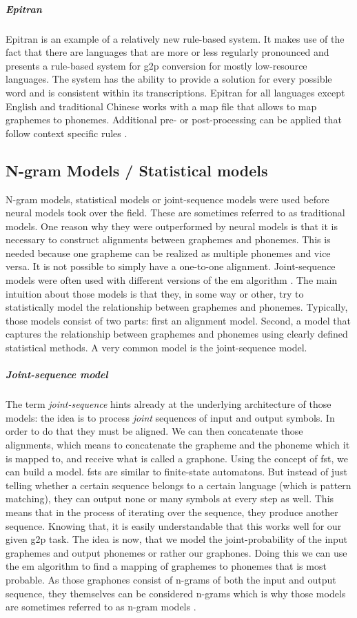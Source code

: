 \subparagraph{Epitran} Epitran is an example of a relatively new rule-based system. It makes use of the fact that there are languages that are more or less regularly pronounced and presents a rule-based system for \ac{g2p} conversion for mostly low-resource languages. The system has the ability to provide a solution for every possible word and is consistent within its transcriptions. Epitran for all languages except English and traditional Chinese works with a map file that allows to map graphemes to phonemes. Additional pre- or post-processing can be applied that follow context specific rules \citep{mortensen-etal-2018-epitran}.


\subsection{N-gram Models / Statistical models}
N-gram models, statistical models or joint-sequence models were used before neural models took over the field. These are sometimes referred to as traditional models. One reason why they were outperformed by neural models is that it is necessary to construct alignments between graphemes and phonemes. This is needed because one grapheme can be realized as multiple phonemes and vice versa. It is not possible to simply have a one-to-one alignment. Joint-sequence models were often used with different versions of the \acf{em} algorithm \citep{lo-nicolai-2021-linguistic}. The main intuition about those models is that they, in some way or other, try to statistically model the relationship between graphemes and phonemes. Typically, those models consist of two parts: first an alignment model. Second, a model that captures the relationship between graphemes and phonemes using clearly defined statistical methods. A very common model is the joint-sequence model.

\subparagraph{Joint-sequence model} The term \textit{joint-sequence} hints already at the underlying architecture of those models: the idea is to process \textit{joint} sequences of input and output symbols. In order to do that they must be aligned. We can then concatenate those alignments, which means to concatenate the grapheme and the phoneme which it is mapped to, and receive what is called a graphone. Using the concept of \ac{fst}, we can build a model. \acp{fst} are similar to finite-state automatons. But instead of just telling whether a certain sequence belongs to a certain language (which is pattern matching), they can output none or many symbols at every step as well. This means that in the process of iterating over the sequence, they produce another sequence. Knowing that, it is easily understandable that this works well for our given \ac{g2p} task. The idea is now, that we model the joint-probability of the input graphemes and output phonemes or rather our graphones. Doing this we can use the \ac{em} algorithm to find a mapping of graphemes to phonemes that is most probable. As those graphones consist of n-grams of both the input and output sequence, they themselves can be considered n-grams which is why those models are sometimes referred to as n-gram models \citep{ney-joint-sequence2008, lo-nicolai-2021-linguistic}.

